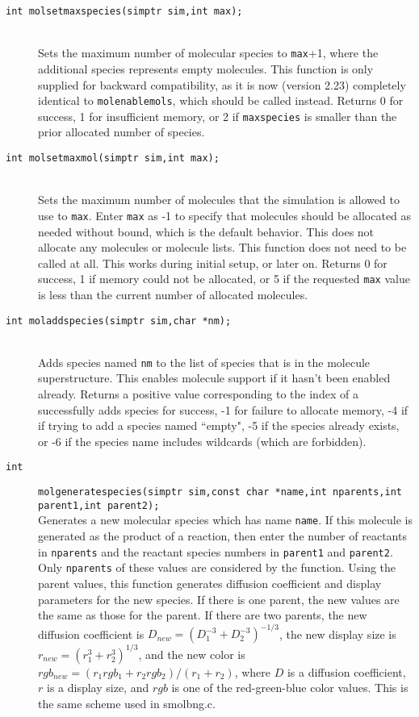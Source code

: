 \documentclass {book}
\newcommand {\ttt} {\texttt}
\begin{document}
\begin{description}
\item[\ttt{int molsetmaxspecies(simptr sim,int max);}]
\hfill \\
Sets the maximum number of molecular species to \ttt{max}+1, where the additional species represents empty molecules. This function is only supplied for backward compatibility, as it is now (version 2.23) completely identical to \ttt{molenablemols}, which should be called instead. Returns 0 for success, 1 for insufficient memory, or 2 if \ttt{maxspecies} is smaller than the prior allocated number of species.

\item[\ttt{int molsetmaxmol(simptr sim,int max);}]
\hfill \\
Sets the maximum number of molecules that the simulation is allowed to use to \ttt{max}. Enter \ttt{max} as -1 to specify that molecules should be allocated as needed without bound, which is the default behavior. This does not allocate any molecules or molecule lists. This function does not need to be called at all. This works during initial setup, or later on. Returns 0 for success, 1 if memory could not be allocated, or 5 if the requested \ttt{max} value is less than the current number of allocated molecules.

\item[\ttt{int moladdspecies(simptr sim,char *nm);}]
\hfill \\
Adds species named \ttt{nm} to the list of species that is in the molecule superstructure. This enables molecule support if it hasn't been enabled already. Returns a positive value corresponding to the index of a successfully adds species for success, -1 for failure to allocate memory, -4 if if trying to add a species named ``empty", -5 if the species already exists, or -6 if the species name includes wildcards (which are forbidden).

\item[\ttt{int}]
\ttt{molgeneratespecies(simptr sim,const char *name,int nparents,int parent1,int parent2);} \\
Generates a new molecular species which has name \ttt{name}. If this molecule is generated as the product of a reaction, then enter the number of reactants in \ttt{nparents} and the reactant species numbers in \ttt{parent1} and \ttt{parent2}. Only \ttt{nparents} of these values are considered by the function. Using the parent values, this function generates diffusion coefficient and display parameters for the new species. If there is one parent, the new values are the same as those for the parent. If there are two parents, the new diffusion coefficient is $D_{new}=(D_1^{-3}+D_2^{-3})^{-1/3}$, the new display size is $r_{new}=(r_1^3+r_2^3)^{1/3}$, and the new color is $rgb_{new}=(r_1rgb_1+r_2rgb_2)/(r_1+r_2)$, where $D$ is a diffusion coefficient, $r$ is a display size, and $rgb$ is one of the red-green-blue color values. This is the same scheme used in smolbng.c.


\end{description}
\end{document}
